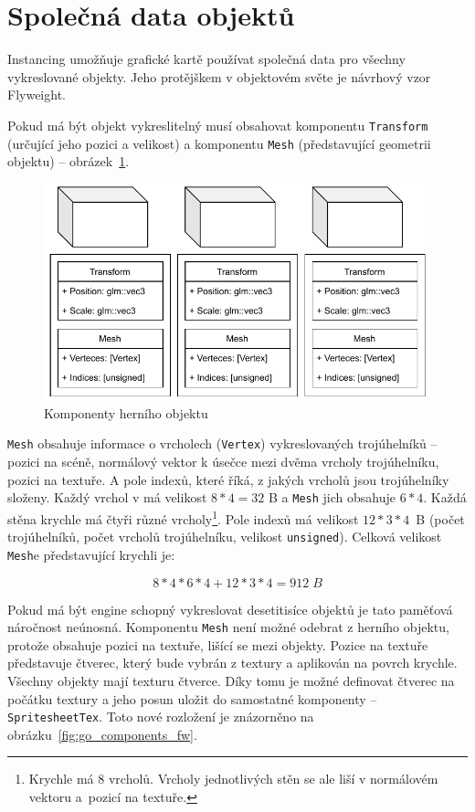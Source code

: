 \documentclass[thesis=M,czech]{FITthesis}[2019/12/23]
\begin{document}
\section{Společná data objektů}

Instancing umožňuje grafické kartě používat společná data pro všechny vykreslované objekty. Jeho protějškem v objektovém světe je návrhový vzor Flyweight.

Pokud má být objekt vykreslitelný musí obsahovat komponentu \texttt{Transform} (určující jeho pozici a velikost) a komponentu \texttt{Mesh} (představující geometrii objektu) -- obrázek~\ref{fig:go_components}.

\begin{figure}\centering
	\includegraphics[width=\textwidth]{images/go_components}
	\caption[Komponenty herního objektu]{Komponenty herního objektu}\label{fig:go_components}
\end{figure}

\texttt{Mesh} obsahuje informace o vrcholech (\texttt{Vertex}) vykreslovaných trojúhelníků -- pozici na scéně, normálový vektor k úsečce mezi dvěma vrcholy trojúhelníku, pozici na textuře. A pole indexů, které říká, z jakých vrcholů jsou trojúhelníky složeny. Každý vrchol v má velikost $8 * 4 = 32$ B a \texttt{Mesh} jich obsahuje $6 * 4$. Každá stěna krychle má čtyři různé vrcholy\footnote{Krychle má 8 vrcholů. Vrcholy jednotlivých stěn se ale liší v normálovém vektoru a~pozicí na textuře.}. Pole indexů má velikost $12 * 3 * 4$~B (počet trojúhelníků, počet vrcholů trojúhelníku, velikost \texttt{unsigned}). Celková velikost \texttt{Mesh}e představující krychli je:

\[8 * 4 * 6 * 4 + 12 * 3 * 4 = 912\; B\]

Pokud má být engine schopný vykreslovat desetitisíce objektů je tato paměťová náročnost neúnosná. Komponentu \texttt{Mesh} není možné odebrat z herního objektu, protože obsahuje pozici na textuře, lišící se mezi objekty. Pozice na textuře představuje čtverec, který bude vybrán z textury a aplikován na povrch krychle. Všechny objekty mají texturu čtverce. Díky tomu je možné definovat čtverec na počátku textury a jeho posun uložit do samostatné komponenty -- \texttt{SpritesheetTex}. Toto nové rozložení je znázorněno na obrázku~\ref{fig:go_components_fw}.
\end{document}

